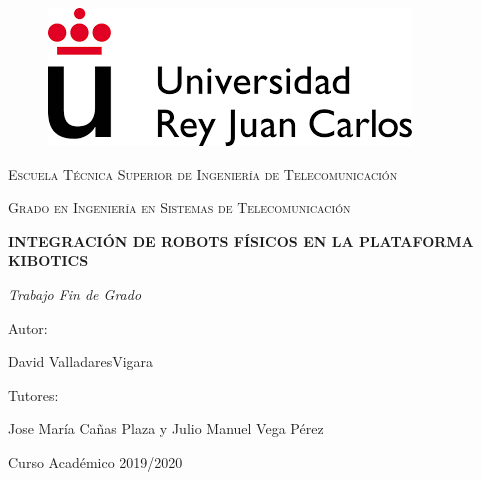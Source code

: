 \documentclass{report}
\begin{document}
\begin{titlepage}
\centering

\begin{figure}[t]
\includegraphics[scale=0.5]{images/urjc_logo.png}
\centering
\vspace{0.5cm} %
\end{figure}

{\scshape\Large Escuela Técnica Superior de Ingeniería de Telecomunicación \par}
\vspace{1cm}
{\scshape\Large Grado en Ingeniería en Sistemas de Telecomunicación \par}
\vspace{3cm}
{\bfseries\LARGE INTEGRACIÓN DE ROBOTS FÍSICOS EN LA PLATAFORMA KIBOTICS \par}
\vspace{3cm}
{\itshape\Large Trabajo Fin de Grado \par}
\vfill
{\Large Autor: }
{\Large David ValladaresVigara \par}
{\Large Tutores: }
{\Large Jose María Cañas Plaza y Julio Manuel Vega Pérez \par}
\vfill
{\Large Curso Académico 2019/2020 \par}
\end{titlepage} 

\renewcommand{\abstractname}{\Large Resumen}
\begin{abstract}



\end{abstract}

\setcounter{tocdepth}{3} %
\renewcommand{\contentsname}{Índice general}
\tableofcontents
\clearpage

\renewcommand{\listfigurename}{Índice de figuras}
\listoffigures


\renewcommand{\lstlistingname}{Fragmento}
\renewcommand{\lstlistlistingname}{Indice de Fragmentos}
\lstlistoflistings
\end{document}
